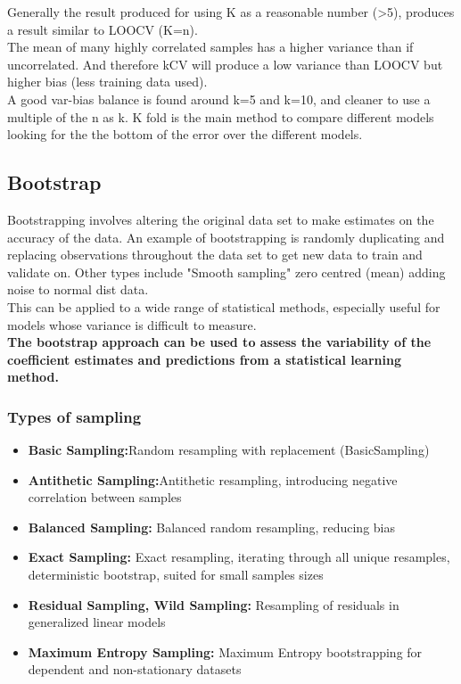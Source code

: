 \documentclass[11pt]{scrartcl} %
\begin{document}
Generally the result produced for using K as a reasonable number (>5), produces a result similar to
LOOCV (K=n).\\

The mean of many highly correlated samples has a higher variance than if uncorrelated. And therefore
kCV will produce a low variance than LOOCV but higher bias (less training data used).\\

A good var-bias balance is found around k=5 and k=10, and cleaner to use a multiple of the n as k.
K fold is the main method to compare different models looking for the the bottom of the error over the
different models.

\subsection{Bootstrap}

Bootstrapping involves altering the original data set to make estimates on the accuracy of the data.
An example of bootstrapping is randomly duplicating and replacing observations throughout the data set
to get new data to train and validate on. Other types include "Smooth sampling" zero centred (mean) 
adding noise to normal dist data. \\

This can be applied to a wide range of statistical methods, especially useful for models whose variance
is difficult to measure.\\

\textbf{The bootstrap approach can be used  to assess the
variability of the coefficient estimates and predictions from a statistical learning method.}

\subsubsection{Types of sampling}

\begin{itemize}
	\item \textbf{Basic Sampling:}Random resampling with replacement (BasicSampling)
	\item \textbf{Antithetic Sampling:}Antithetic resampling, introducing negative correlation between samples
	\item \textbf{Balanced Sampling:} Balanced random resampling, reducing bias
	\item \textbf{Exact Sampling:} Exact resampling, iterating through all unique resamples, deterministic bootstrap, suited for small samples sizes
	\item \textbf{Residual Sampling, Wild Sampling:} Resampling of residuals in generalized linear models 
	\item \textbf{Maximum Entropy Sampling:} Maximum Entropy bootstrapping for dependent and non-stationary datasets 
\end{itemize}
\end{document}
